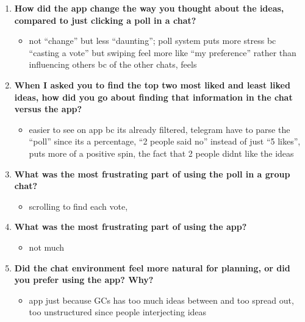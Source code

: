 \documentclass[12pt,a4paper]{article}
\begin{document}
\begin{enumerate}
    \item \textbf{How did the app change the way you thought about the ideas, compared to just clicking a poll in a chat?}
    
    \begin{itemize}
        \item not ``change'' but less ``daunting''; poll system puts more stress bc ``casting a vote'' but swiping feel more like ``my preference'' rather than influencing others bc of the other chats, feels
    \end{itemize}
    
    \item \textbf{When I asked you to find the top two most liked and least liked ideas, how did you go about finding that information in the chat versus the app?}
    
    \begin{itemize}
        \item easier to see on app bc its already filtered, telegram have to parse the ``poll'' since its a percentage, ``2 people said no'' instead of just ``5 likes'', puts more of a positive spin, the fact that 2 people didnt like the ideas
    \end{itemize}
    
    \item \textbf{What was the most frustrating part of using the poll in a group chat?}
    
    \begin{itemize}
        \item scrolling to find each vote,
    \end{itemize}
    
    \item \textbf{What was the most frustrating part of using the app?}
    
    \begin{itemize}
        \item not much
    \end{itemize}
    
    \item \textbf{Did the chat environment feel more natural for planning, or did you prefer using the app? Why?}
    
    \begin{itemize}
        \item app just because GCs has too much ideas between and too spread out, too unstructured since people interjecting ideas
    \end{itemize}
\end{enumerate}
\end{document}
